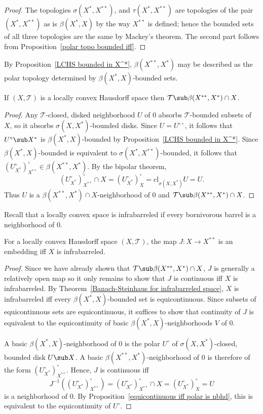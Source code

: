\begin{proof}
The topologies $\sigma(X^*,X^{**})$, and $\tau(X^*,X^{**})$ are topologies of the pair $(X^*,X^{**})$ as is $\beta(X^*,X)$ by the way $X^{**}$ is defined; hence the bounded sets of all three topologies are the same by Mackey's theorem. The second part follows from Proposition~\ref{polar topo bounded iff}.
\end{proof}
By Proposition~\ref{LCHS bounded in X^*}, $\beta(X^{**},X^*)$ may be described as the polar topology determined by $\beta(X^*,X)$-bounded sets.
\begin{proposition}\label{LCHS topo weak than bidual}
If $(X,\mathcal{T})$ is a locally convex Hausdorff space then $\mathcal{T}\sub\beta(X^{**},X^*)\cap X$.
\end{proposition}
\begin{proof}
Any $\mathcal{T}$-closed, disked neighborhood $U$ of $0$ absorbs $\mathcal{T}$-bounded subsets of $X$, so it absorbs $\sigma(X,X^*)$-bounded disks. Since $U=U^{\circ\circ}$, it follows that $U^\circ\sub X^*$ is $\beta(X^*,X)$-bounded by Proposition~\ref{LCHS bounded in X^*}. Since $\beta(X^*,X)$-bounded is equivalent to $\sigma(X^*,X^{**})$-bounded, it follows that $(U^{\circ}_{X^*})^\circ_{X^{**}}\in\beta(X^{**},X^*)$. By the bipolar theorem,
\[(U^{\circ}_{X^*})^\circ_{X^{**}}\cap X=(U^{\circ}_{X^*})^{\circ}_{X}=\mathrm{cl}_{\sigma(X,X^*)}U=U.\]
Thus $U$ is a $\beta(X^{**},X^*)\cap X$-neighborhood of $0$ and $\mathcal{T}\sub\beta(X^{**},X^*)\cap X$.
\end{proof}
Recall that a locally convex space is infrabarreled if every bornivorous barrel is a neighborhood of $0$.
\begin{theorem}\label{LCHS J embedding iff infrabarreled}
For a locally convex Hausdorff space $(X,\mathcal{T})$, the map $J:X\to X^{**}$ is an embedding iff $X$ is infrabarreled.
\end{theorem}
\begin{proof}
Since we have already shown that $\mathcal{T}\sub\beta(X^{**},X^*)\cap X$, $J$ is generally a relatively open map so it only remains to show that $J$ is continuous iff $X$ is infrabarreled. By Theorem~\ref{Banach-Steinhaus for infrabarreled space}, $X$ is infrabarreled iff every $\beta(X^*,X)$-bounded set is equicontinuous. Since subsets of equicontinuous sets are equicontinuous, it suffices to show that continuity of $J$ is equivalent to the equicontinuity of basic $\beta(X^*,X)$-neighborhoods $V$ of $0$.\par
A basic $\beta(X^*,X)$-neighborhood of $0$ is the polar $U^\circ$ of $\sigma(X,X^*)$-closed, bounded disk $U\sub X$. A basic $\beta(X^{**},X^*)$-neighborhood of $0$ is therefore of the form $(U^\circ_{X^*})^\circ_{X^{**}}$. Hence, $J$ is continuous iff
\[J^{-1}((U^\circ_{X^*})^\circ_{X^{**}})=(U^\circ_{X^*})^\circ_{X^{**}}\cap X=(U^{\circ}_{X^*})^{\circ}_{X}=U\]
is a neighborhood of $0$. By Proposition~\ref{equicontinuous iff polar is nbhd}, this is equivalent to the equicontinuity of $U^\circ$.
\end{proof}
